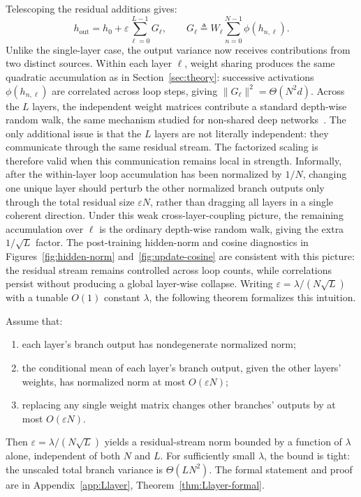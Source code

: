 Telescoping the residual additions gives:
\[
  h_{\text{out}}
  =
  h_0+\varepsilon\sum_{\ell=0}^{L-1}G_\ell,
  \qquad
  G_\ell \triangleq W_\ell\sum_{n=0}^{N-1}\phi(h_{n,\ell}).
\]
Unlike the single-layer case, the output variance now receives contributions from two distinct sources.
Within each layer $\ell$, weight sharing produces the same quadratic accumulation as in Section~\ref{sec:theory}: successive activations $\phi(h_{n,\ell})$ are correlated across loop steps, giving $\|G_\ell\|^2=\Theta(N^2 d)$.
Across the $L$ layers, the independent weight matrices contribute a standard depth-wise random walk, the same mechanism studied for non-shared deep networks~\citep{dey2025completep}.
The only additional issue is that the $L$ layers are not literally independent: they communicate through the same residual stream.
The factorized scaling is therefore valid when this communication remains local in strength.
Informally, after the within-layer loop accumulation has been normalized by $1/N$, changing one unique layer should perturb the other normalized branch outputs only through the total residual size $\varepsilon N$, rather than dragging all layers in a single coherent direction.
Under this weak cross-layer-coupling picture, the remaining accumulation over $\ell$ is the ordinary depth-wise random walk, giving the extra $1/\!\sqrt{L}$ factor.
The post-training hidden-norm and cosine diagnostics in Figures~\ref{fig:hidden-norm} and~\ref{fig:update-cosine} are consistent with this picture: the residual stream remains controlled across loop counts, while correlations persist without producing a global layer-wise collapse.
Writing $\varepsilon=\lambda/(N\!\sqrt{L})$ with a tunable $O(1)$ constant $\lambda$, the following theorem formalizes this intuition.

\begin{theorem}
\label{thm:Llayer}
Assume that\textup{:}
\begin{enumerate}
\item[\textup{(i)}] each layer's branch output has nondegenerate normalized norm\textup{;}
\item[\textup{(ii)}] the conditional mean of each layer's branch output, given the other layers' weights, has normalized norm at most $O(\varepsilon N)$\textup{;}
\item[\textup{(iii)}] replacing any single weight matrix changes other branches' outputs by at most $O(\varepsilon N)$\textup{.}
\end{enumerate}
Then $\varepsilon=\lambda/(N\!\sqrt{L})$ yields a residual-stream norm bounded by a function of $\lambda$ alone, independent of both $N$ and $L$.
For sufficiently small $\lambda$, the bound is tight\textup{:} the unscaled total branch variance is $\Theta(LN^2)$.
The formal statement and proof are in Appendix~\ref{app:Llayer}, Theorem~\ref{thm:Llayer-formal}.
\end{theorem}

